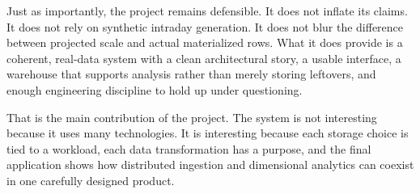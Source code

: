 \documentclass[11pt,a4paper]{article}
\begin{document}
Just as importantly, the project remains defensible. It does not inflate its claims. It does not rely on synthetic intraday generation. It does not blur the difference between projected scale and actual materialized rows. What it does provide is a coherent, real-data system with a clean architectural story, a usable interface, a warehouse that supports analysis rather than merely storing leftovers, and enough engineering discipline to hold up under questioning.

That is the main contribution of the project. The system is not interesting because it uses many technologies. It is interesting because each storage choice is tied to a workload, each data transformation has a purpose, and the final application shows how distributed ingestion and dimensional analytics can coexist in one carefully designed product.
\end{document}
